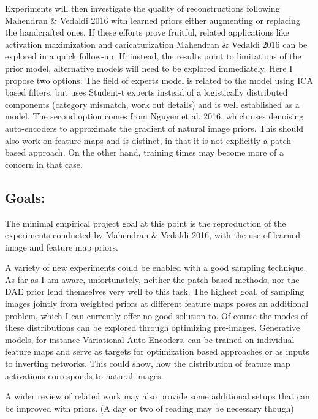 \documentclass{article}
\begin{document}
Experiments will then investigate the quality of reconstructions following Mahendran \& Vedaldi 2016 with learned priors either augmenting or replacing the handcrafted ones.
If these efforts prove fruitful, related applications like activation maximization and caricaturization Mahendran \& Vedaldi 2016 can be explored in a quick follow-up. If, instead, the results point to limitations of the prior model, alternative models will need to be explored immediately. Here I propose two options: The field of experts model is related to the model using ICA based filters, but uses Student-t experts instead of a logistically distributed components (category mismatch, work out details) and is well established as a model. The second option comes from Nguyen et al. 2016, which uses denoising auto-encoders to approximate the gradient of natural image priors. This should also work on feature maps and is distinct, in that it is not explicitly a patch-based approach. On the other hand, training times may become more of a concern in that case.

\subsection{Goals:}

The minimal empirical project goal at this point is the reproduction of the experiments conducted by Mahendran \& Vedaldi 2016, with the use of learned image and feature map priors.

A variety of new experiments could be enabled with a good sampling technique. As far as I am aware, unfortunately, neither the patch-based methods, nor the DAE prior lend themselves very well to this task. The highest goal, of sampling images jointly from weighted priors at different feature maps poses an additional problem, which I can currently offer no good solution to. Of course the modes of these distributions can be explored through optimizing pre-images. 
Generative models, for instance Variational Auto-Encoders, can be trained on individual feature maps and serve as targets for optimization based approaches or as inputs to inverting networks. This could show, how the distribution of feature map activations corresponds to natural images.

A wider review of related work may also provide some additional setups that can be improved with priors. (A day or two of reading may be necessary though)
\end{document}
